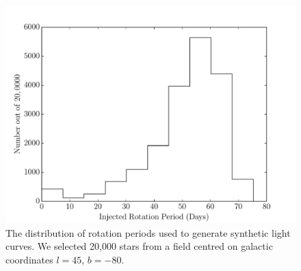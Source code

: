 \documentclass[useAMS, usenatbib, preprint, 12pt]{aastex}
\newcommand{\LSST}{{\it LSST}}
\begin{document}
\begin{figure}
\begin{center}
\includegraphics[width=6in, clip=true]{figures/trilegal_period_hist-80.pdf}
\caption[The period distribution for stars used in \LSST\
simulations]
{The distribution of rotation periods used to generate synthetic light curves.
We selected 20,000 stars from a field centred on galactic coordinates $l=45$,
$b=-80$.}
\label{fig:trilegal_period_hist}
\end{center}
\end{figure}
\end{document}
